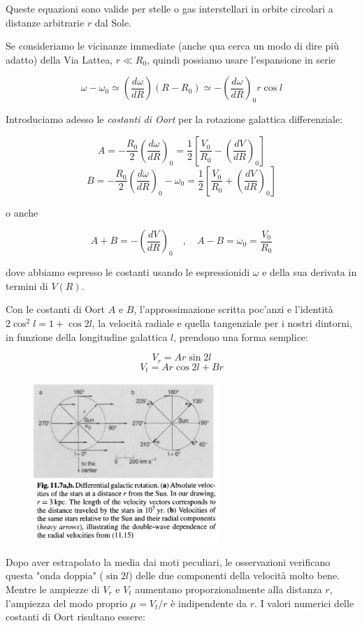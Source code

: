 Queste equazioni sono valide per stelle o gas interstellari in orbite circolari a distanze arbitrarie $r$ dal Sole.

Se consideriamo le vicinanze immediate (anche qua cerca un modo di dire più adatto) della Via Lattea, $r \ll R_0$, quindi possiamo usare l'espansione in serie

$$\omega - \omega_0
\simeq \left( \frac{d\omega}{dR} \right) (R - R_0)
\simeq - \left( \frac{d\omega}{dR} \right)_0 r \cos{l}$$

Introduciamo adesso le \textit{costanti di Oort} per la rotazione galattica differenziale:

$$A=-\frac{R_0}{2} \left( \frac{d\omega}{dR} \right)_0
=\frac{1}{2} \left[ \frac{V_0}{R_0} - \left( \frac{dV}{dR} \right)_0 \right]$$
$$B=-\frac{R_0}{2} \left( \frac{d\omega}{dR} \right)_0 - \omega_0
=\frac{1}{2} \left[ \frac{V_0}{R_0} + \left( \frac{dV}{dR} \right)_0 \right]$$

o anche

$$A+B=-\left( \frac{dV}{dR} \right)_0
\quad,\quad
A-B=\omega_0=\frac{V_0}{R_0}$$

dove abbiamo espresso le costanti usando le espressionidi $\omega$ e della sua derivata in termini di $V(R)$.

Con le costanti di Oort $A$ e $B$, l'approssimazione scritta poc'anzi e l'identità $2 \cos^2{l}= 1 + \cos{2l}$, la velocità radiale e quella tangenziale per i nostri dintorni, in funzione della longitudine galattica $l$, prendono una forma semplice:

$$V_r=Ar \sin{2l}$$
$$V_t=Ar \cos{2l} + Br$$

\begin{figure}[H]
    \centering
    \includegraphics[width=7cm]{immagini/parametri_Oort_2.png}
\end{figure}

Dopo aver estrapolato la media dai moti peculiari, le osservazioni verificano questa "onda doppia" ($\sin{2l}$) delle due componenti della velocità molto bene. Mentre le ampiezze di $V_r$ e $V_t$ aumentano proporzionalmente alla distanza $r$, l'ampiezza del modo proprio $\mu=V_t/r$ è indipendente da $r$. I valori numerici delle costanti di Oort risultano essere:

